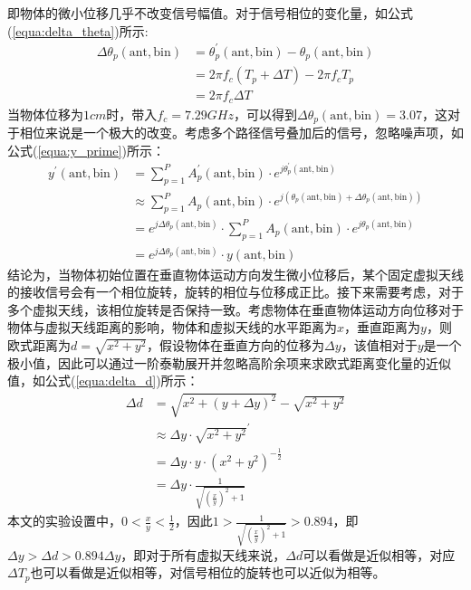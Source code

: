 即物体的微小位移几乎不改变信号幅值。对于信号相位的变化量，如公式(\ref{equa:delta_theta})所示:
\begin{equation}
    \label{equa:delta_theta}
    \begin{aligned}
        \Delta \theta_{p}(\text{ant},\text{bin}) &= \theta_{p}^{\prime}(\text{ant},\text{bin}) - \theta_{p}(\text{ant},\text{bin}) \\
                                   &= 2\pi f_c (T_p+\Delta T) - 2\pi f_c T_p  \\
                                   &= 2\pi f_c \Delta T
    \end{aligned}
\end{equation}
当物体位移为$1cm$时，带入$f_c = 7.29GHz$，可以得到$\Delta \theta_{p}(\text{ant},\text{bin}) = 3.07$，这对于相位来说是一个极大的改变。考虑多个路径信号叠加后的信号，忽略噪声项，如公式(\ref{equa:y_prime})所示：
\begin{equation}
    \label{equa:y_prime}
    \begin{aligned}
        y^{\prime}(\text{ant},\text{bin}) &= \sum_{p=1}^{P} A_p^{\prime}(\text{ant},\text{bin}) \cdot e^{j\theta_{p}^{\prime}(\text{ant},\text{bin})} \\
                    &\approx  \sum_{p=1}^{P} A_p(\text{ant},\text{bin}) \cdot e^{j\left(\theta_{p}(\text{ant},\text{bin})+ \Delta \theta_{p}(\text{ant},\text{bin}) \right)} \\
                    &= e^{j\Delta \theta_{p}(\text{ant},\text{bin})}\cdot \sum_{p=1}^{P} A_p(\text{ant},\text{bin}) \cdot e^{j\theta_{p}(\text{ant},\text{bin})} \\
                    &= e^{j\Delta \theta_{p}(\text{ant},\text{bin})}\cdot y(\text{ant},\text{bin})
    \end{aligned}
\end{equation}
结论为，当物体初始位置在垂直物体运动方向发生微小位移后，某个固定虚拟天线的接收信号会有一个相位旋转，旋转的相位与位移成正比。接下来需要考虑，对于多个虚拟天线，该相位旋转是否保持一致。考虑物体在垂直物体运动方向位移对于物体与虚拟天线距离的影响，物体和虚拟天线的水平距离为$x$，垂直距离为$y$，则欧式距离为$d = \sqrt{x^2+y^2} $，假设物体在垂直方向的位移为$\Delta y$，该值相对于$y$是一个极小值，因此可以通过一阶泰勒展开并忽略高阶余项来求欧式距离变化量的近似值，如公式(\ref{equa:delta_d})所示：
\begin{equation}
    \label{equa:delta_d}
    \begin{aligned}
        \Delta d &=  \sqrt{x^2+(y+\Delta y)^2}-\sqrt{x^2+y^2} \\
                 &\approx \Delta y \cdot \sqrt{x^2+y^2}^{\prime} \\
                 &= \Delta y \cdot y \cdot (x^2+y^2)^{-\frac{1}{2}} \\
                 &= \Delta y \cdot \frac{1}{\sqrt{{\left(\frac{x}{y}\right)^2}+1}}
    \end{aligned}
\end{equation}
本文的实验设置中，$0 < \frac{x}{y} < \frac{1}{2}$，因此$1 > \frac{1}{\sqrt{{\left(\frac{x}{y}\right)^2}+1}} > 0.894$，即$\Delta y > \Delta d > 0.894 \Delta y$，即对于所有虚拟天线来说，$\Delta d$可以看做是近似相等，对应$\Delta T_p$也可以看做是近似相等，对信号相位的旋转也可以近似为相等。

